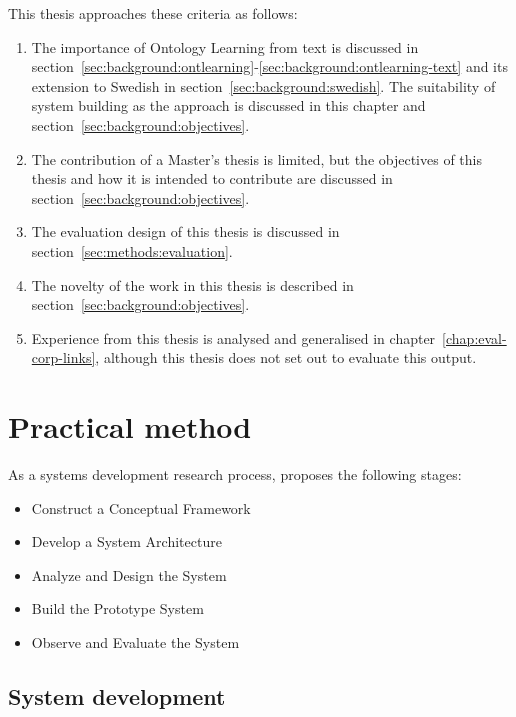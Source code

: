\documentclass[a4paper]{report}
\newcommand{\todo}[1]{}
\begin{document}
This thesis approaches these criteria as follows:
\begin{enumerate}
\item The importance of Ontology Learning from text is discussed in section~\ref{sec:background:ontlearning}-\ref{sec:background:ontlearning-text} and its extension to Swedish in section~\ref{sec:background:swedish}.
The suitability of system building as the approach is discussed in this chapter and section~\ref{sec:background:objectives}.
\item The contribution of a Master's thesis is limited, but the objectives of this thesis and how it is intended to contribute are discussed in section~\ref{sec:background:objectives}.
\item The evaluation design of this thesis is discussed in section~\ref{sec:methods:evaluation}.
\todo{Acknowledge that this doesn't cover the validity of the suggestions derived; look up validity of exploratory research and see what's needed for that}
\item The novelty of the work in this thesis is described in section~\ref{sec:background:objectives}.
\item Experience from this thesis is analysed and generalised in chapter~\ref{chap:eval-corp-links}, although this thesis does not set out to evaluate this output.
\end{enumerate}

\section{Practical method}

As a systems development research process, \cite{NunamakerChen90SDResearch} proposes the following stages:

\begin{itemize}
\item Construct a Conceptual Framework
\item Develop a System Architecture
\item Analyze and Design the System
\item Build the Prototype System
\item Observe and Evaluate the System
\end{itemize}

\subsection{System development}
\end{document}
